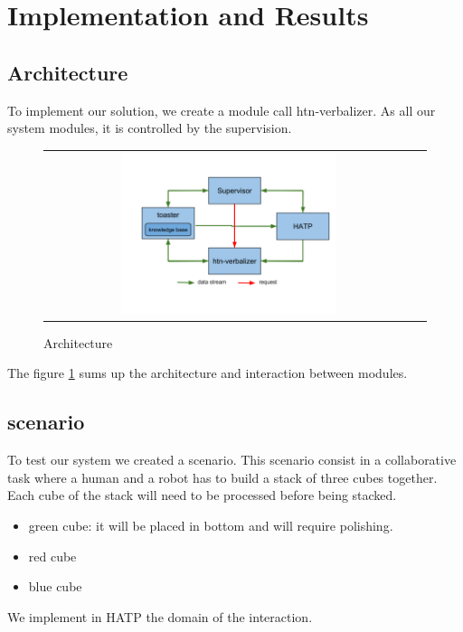 \documentclass{llncs}
\begin{document}

\section{Implementation and Results}
\subsection{Architecture}
To implement our solution, we create a module call htn-verbalizer. 
As all our system modules, it is controlled by the supervision.

\begin{figure}[ht!]

   \vspace{-20pt}
 \centering
 \begin{tabular}{cc}
  \includegraphics[width=0.6\textwidth]{img/archi.png}
 \end{tabular}
 \caption{Architecture}
 \label{fig:architecture}
   \vspace{-12pt}
 \end{figure}

The figure \ref{fig:architecture}
sums up the architecture and interaction between modules.


\subsection{scenario}
To test our system we created a scenario.
This scenario consist in a collaborative task where a human and a robot has to build a stack of three cubes together. 
Each cube of the stack will need to be processed before being stacked.
\begin{itemize}
\item green cube: it will be placed in bottom and will require polishing.
\item red cube
\item blue cube
\end{itemize}
We implement in HATP the  domain of the interaction.
\end{document}
